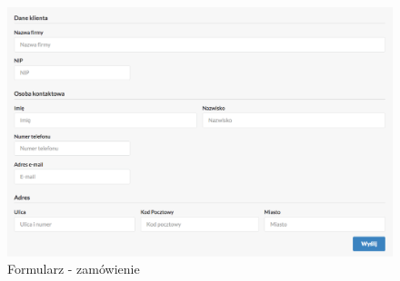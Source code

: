 	\begin{figure}[H]
		\centering
		\centerline{\includegraphics[width=1.2\textwidth]{partials/2-wymagania/dokumenty/oferta-firma.png}}
		\caption{Formularz - zamówienie}
	\end{figure}
